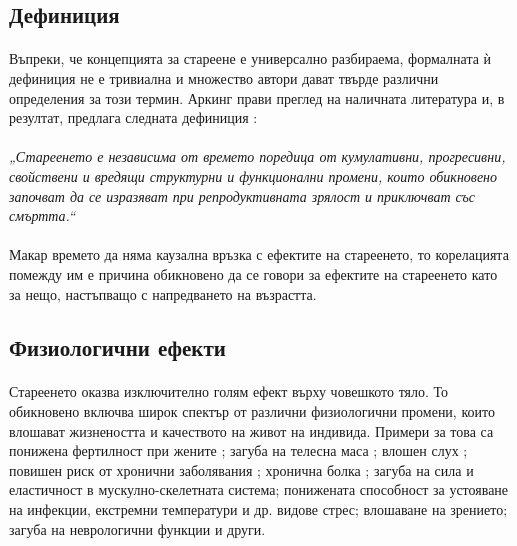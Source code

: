 \documentclass[pdftex,cyrillic,14pt,a4page,twoside,openright]{extreport}
\begin{document}
\subsection{Дефиниция}
\paragraph{}
Въпреки, че концепцията за стареене е универсално разбираема, формалната ѝ дефиниция не е тривиална и множество автори дават твърде различни определения за този термин. Аркинг прави преглед на наличната литература и, в резултат, предлага следната дефиниция \cite{arking2006biology}:

\paragraph{}
\textit{„Стареенето е независима от времето поредица от кумулативни, прогресивни, свойствени и вредящи структурни и функционални промени, които обикновено започват да се изразяват при репродуктивната зрялост и приключват със смъртта.“}

\paragraph{}
Макар времето да няма каузална връзка с ефектите на стареенето, то корелацията помежду им е причина обикновено да се говори за ефектите на стареенето като за нещо, настъпващо с напредването на възрастта.

\subsection{Физиологични ефекти}
\paragraph{}
Стареенето оказва изключително голям ефект върху човешкото тяло. То обикновено включва широк спектър от различни физиологични промени, които влошават жизнеността и качеството на живот на индивида. Примери за това са понижена фертилност при жените \cite{kamath2010}; загуба на телесна маса \cite{spencer1996}; влошен слух \cite{feder2015}; повишен риск от хронични заболявания \cite{larson2013, prasad2012}; хронична болка \cite{geriatrics2002}; загуба на сила и еластичност в мускулно-скелетната система; понижената способност за устояване на инфекции, екстремни температури и др. видове стрес; влошаване на зрението; загуба на неврологични функции \cite{vina2007} и други.
\end{document}
